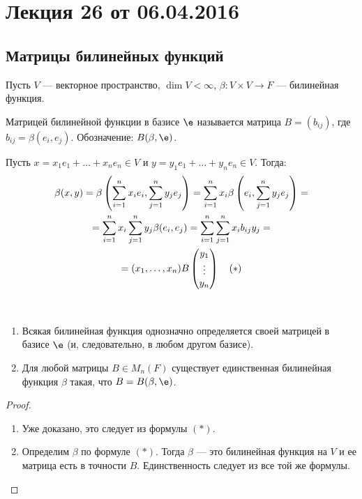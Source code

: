 \section{Лекция 26 от 06.04.2016}

\subsection*{Матрицы билинейных функций}
Пусть $V$ --- векторное пространство, $\dim V < \infty$, $\beta \colon V \times V \rightarrow F$ --- билинейная функция.

\begin{Def}
Матрицей билинейной функции в базисе $\e$ называется матрица $B = (b_{ij})$, где $b_{ij} = \beta(e_i, e_j)$. Обозначение: $B(\beta, \e)$.
\end{Def}

Пусть $x = x_1e_1 + \ldots + x_ne_n \in V$ и $y = y_1e_1 + \ldots + y_ne_n \in V$. Тогда:
\begin{gather*}
\beta(x, y) = \beta\left(\sum_{i = 1}^{n}x_ie_i, \sum_{j = 1}^{n}y_je_j\right) = \sum_{i = 1}^{n} x_i\beta\left(e_i, \sum_{j = 1}^{n}y_je_j\right) = \\
= \sum_{i = 1}^{n}x_i\sum_{j = 1}^{n}y_j\beta(e_i, e_j) = \sum_{i = 1}^{n}\sum_{j = 1}^{n}x_ib_{ij}y_j = \\
= (x_1, \ldots, x_n)B \begin{pmatrix}{y}_1 \\\vdots\\{y}_n\end{pmatrix} \quad (*)
\end{gather*}

\begin{Suggestion}\
\begin{enumerate}
\item Всякая билинейная функция однозначно определяется своей матрицей в базисе $\e$ (и, следовательно, в любом другом базисе).
\item Для любой матрицы $B \in M_n(F)$ существует единственная билинейная функция $\beta$ такая, что $B = B(\beta, \e)$.
\end{enumerate}
\end{Suggestion}

\begin{proof}\
\begin{enumerate}
\item Уже доказано, это следует из формулы $(*)$.
\item Определим $\beta$ по формуле $(*)$. Тогда $\beta$ --- это билинейная функция на $V$ и ее матрица есть в точности $B$. Единственность следует из все той же формулы.
\end{enumerate}
\end{proof}

